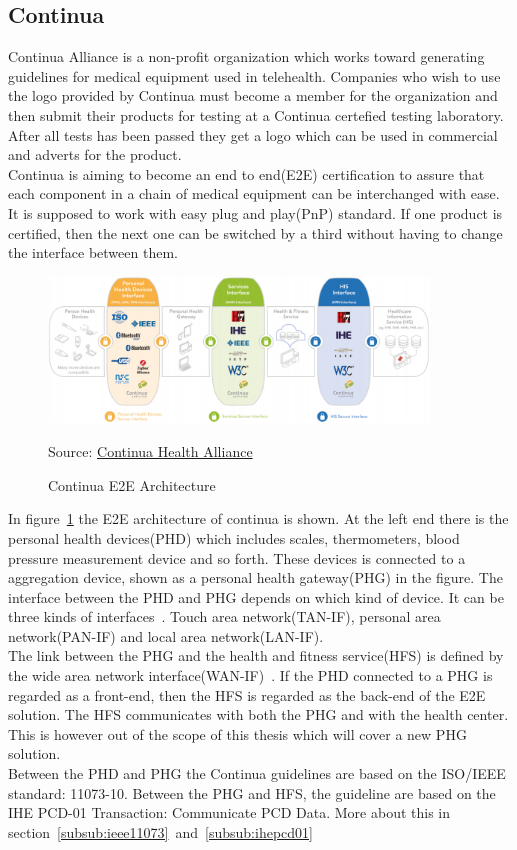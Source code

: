 \subsection{Continua}
\label{sub:continua}
Continua Alliance is a non-profit organization which works toward generating guidelines for medical equipment used in telehealth. Companies who wish to use the logo provided by Continua must become a member for the organization and then submit their products for testing at a Continua certefied testing laboratory. After all tests has been passed they get a logo which can be used in commercial and adverts for the product.\\
Continua is aiming to become an end to end(E2E) certification to assure that each component in a chain of medical equipment can be interchanged with ease. It is supposed to work with easy plug and play(PnP) standard. If one product is certified, then the next one can be switched by a third without having to change the interface between them.\\
\begin{figure}[]
	\centering
    	\includegraphics[width=0.9\textwidth]{Pictures/e2eArch}
		\caption{Continua E2E Architecture}
		Source: \href{http://www.continuaalliance.org/}{Continua Health Alliance}
	\label{fig:e2eArch}
\end{figure}
	In figure~\ref{fig:e2eArch} the E2E architecture of continua is shown. At the left end there is the personal health devices(PHD) which includes scales, thermometers, blood pressure measurement device and so forth. These devices is connected to a aggregation device, shown as a personal health gateway(PHG) in the figure. The interface between the PHD and PHG depends on which kind of device. It can be three kinds of interfaces~\cite{tanpanlan}. Touch  area network(TAN-IF), personal area network(PAN-IF) and local area network(LAN-IF).\\
	The link between the PHG and the health and fitness service(HFS) is defined by the wide area network interface(WAN-IF)~\cite{wan-if}. If the PHD connected to a PHG is regarded as a front-end, then the HFS is regarded as the back-end of the E2E solution. The HFS communicates with both the PHG and with the health center. This is however out of the scope of this thesis which will cover a new PHG solution.\\
	Between the PHD and PHG the Continua guidelines are based on the ISO/IEEE standard: 11073-10. Between the PHG and HFS, the guideline are based on the IHE PCD-01 Transaction: Communicate PCD Data. More about this in section~\ref{subsub:ieee11073}~and~\ref{subsub:ihepcd01}

